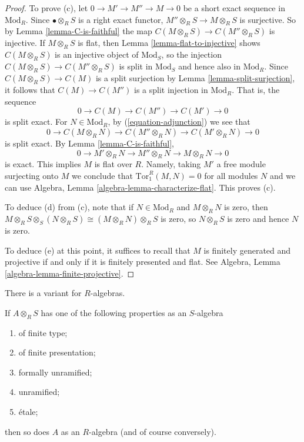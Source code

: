 \begin{proof}
\medskip\noindent
To prove (c), let $0 \to M' \to M'' \to M \to 0$ be a short exact sequence in 
$\text{Mod}_R$. Since $\bullet \otimes_R S$ is a right exact functor,
$M'' \otimes_R S \to M \otimes_R S$ is surjective. So by
Lemma \ref{lemma-C-is-faithful} the map
$C(M \otimes_R S) \to C(M'' \otimes_R S)$ is injective.
If $M \otimes_R S$ is flat, then
Lemma \ref{lemma-flat-to-injective} shows
$C(M \otimes_R S)$ is an injective object of $\text{Mod}_S$, so the injection
$C(M \otimes_R S) \to C(M'' \otimes_R S)$
is split in $\text{Mod}_S$ and hence also in $\text{Mod}_R$.
Since $C(M \otimes_R S) \to C(M)$ is a split surjection by 
Lemma \ref{lemma-split-surjection}, it follows that 
$C(M) \to C(M'')$ is a split injection in $\text{Mod}_R$. That is, the sequence
$$
0 \to C(M) \to C(M'') \to C(M') \to 0
$$
is split exact. 
For $N \in \text{Mod}_R$, by (\ref{equation-adjunction}) we see that 
$$
0 \to C(M \otimes_R N) \to C(M'' \otimes_R N) \to C(M' \otimes_R N) \to 0
$$
is split exact. By Lemma \ref{lemma-C-is-faithful}, 
$$
0 \to M' \otimes_R N \to M'' \otimes_R N \to M \otimes_R N \to 0
$$
is exact. This implies $M$ is flat over $R$. Namely, taking
$M'$ a free module surjecting onto $M$ we conclude that
$\text{Tor}_1^R(M, N) = 0$ for all modules $N$ and we can use
Algebra, Lemma \ref{algebra-lemma-characterize-flat}.
This proves (c).

\medskip\noindent
To deduce (d) from (c), note that if $N \in \text{Mod}_R$ and $M \otimes_R N$ 
is zero,
then $M \otimes_R S \otimes_S (N \otimes_R S) \cong (M \otimes_R N) \otimes_R 
S$ is zero,
so $N \otimes_R S$ is zero and hence $N$ is zero.

\medskip\noindent
To deduce (e) at this point, it suffices to recall that $M$ is finitely 
generated and projective if and only if it is finitely presented and flat.
See Algebra, Lemma \ref{algebra-lemma-finite-projective}.
\end{proof}

\noindent
There is a variant for $R$-algebras.

\begin{theorem}
\label{theorem-descend-algebra-properties}
If $A \otimes_R S$ has one of the following properties as an $S$-algebra
\begin{enumerate}
\item[(a)]
of finite type;
\item[(b)]
of finite presentation;
\item[(c)]
formally unramified;
\item[(d)]
unramified;
\item[(e)]
\'etale;
\end{enumerate}
then so does $A$ as an $R$-algebra (and of course conversely).
\end{theorem}

